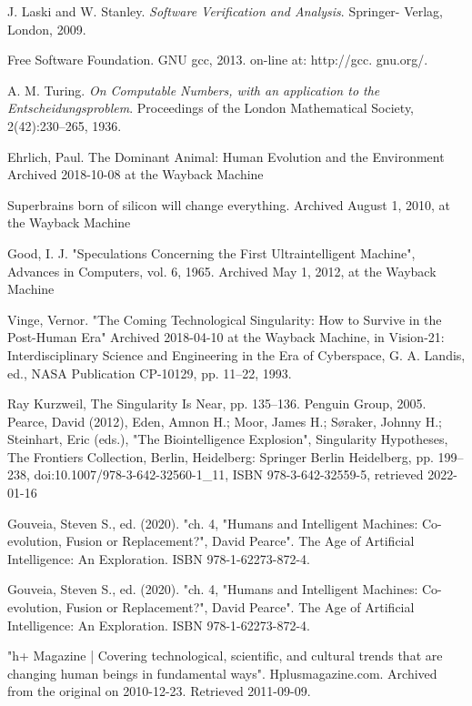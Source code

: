 \documentclass[a4paper]{article}
\begin{document}
\begin{thebibliography}{9}

 J. Laski and W. Stanley. \emph{Software Verification and Analysis}. Springer- Verlag, London, 2009.

 Free Software Foundation. GNU gcc, 2013. on-line at: http://gcc. gnu.org/.

 A. M. Turing. \emph{On Computable Numbers, with an application to the Entscheidungsproblem}. Proceedings of the London Mathematical Society, 2(42):230–265, 1936.

 Ehrlich, Paul. The Dominant Animal: Human Evolution and the Environment Archived 2018-10-08 at the Wayback Machine

 Superbrains born of silicon will change everything. Archived August 1, 2010, at the Wayback Machine

  Good, I. J. "Speculations Concerning the First Ultraintelligent Machine", Advances in Computers, vol. 6, 1965. Archived May 1, 2012, at the Wayback Machine
 
   Vinge, Vernor. "The Coming Technological Singularity: How to Survive in the Post-Human Era" Archived 2018-04-10 at the Wayback Machine, in Vision-21: Interdisciplinary Science and Engineering in the Era of Cyberspace, G. A. Landis, ed., NASA Publication CP-10129, pp. 11–22, 1993.
  
   Ray Kurzweil, The Singularity Is Near, pp. 135–136. Penguin Group, 2005.
 Pearce, David (2012), Eden, Amnon H.; Moor, James H.; Søraker, Johnny H.; Steinhart, Eric (eds.), "The Biointelligence Explosion", Singularity Hypotheses, The Frontiers Collection, Berlin, Heidelberg: Springer Berlin Heidelberg, pp. 199–238, doi:10.1007/978-3-642-32560-1\_11, ISBN 978-3-642-32559-5, retrieved 2022-01-16


 Gouveia, Steven S., ed. (2020). "ch. 4, "Humans and Intelligent Machines: Co-evolution, Fusion or Replacement?", David Pearce". The Age of Artificial Intelligence: An Exploration. ISBN 978-1-62273-872-4.

 Gouveia, Steven S., ed. (2020). "ch. 4, "Humans and Intelligent Machines: Co-evolution, Fusion or Replacement?", David Pearce". The Age of Artificial Intelligence: An Exploration. ISBN 978-1-62273-872-4.

 "h+ Magazine | Covering technological, scientific, and cultural trends that are changing human beings in fundamental ways". Hplusmagazine.com. Archived from the original on 2010-12-23. Retrieved 2011-09-09.


\end{thebibliography}
\end{document}

